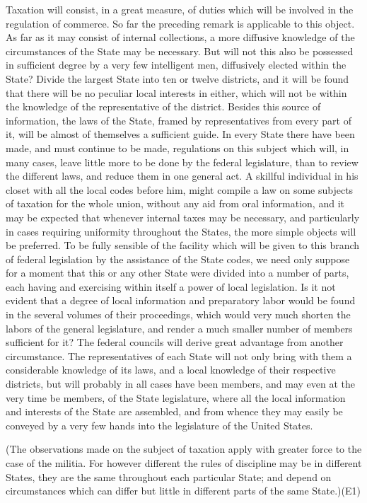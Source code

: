 Taxation will consist, in a great measure, of duties which will be involved in the regulation of commerce. 
So far the preceding remark is applicable to this object. 
As far as it may consist of internal collections, a more diffusive knowledge of the circumstances of the State may be necessary. 
But will not this also be possessed in sufficient degree by a very few intelligent men, diffusively elected within the State? 
Divide the largest State into ten or twelve districts, and it will be found that there will be no peculiar local interests in either, which will not be within the knowledge of the representative of the district. 
Besides this source of information, the laws of the State, framed by representatives from every part of it, will be almost of themselves a sufficient guide. 
In every State there have been made, and must continue to be made, regulations on this subject which will, in many cases, leave little more to be done by the federal legislature, than to review the different laws, and reduce them in one general act. 
A skillful individual in his closet with all the local codes before him, might compile a law on some subjects of taxation for the whole union, without any aid from oral information, and it may be expected that whenever internal taxes may be necessary, and particularly in cases requiring uniformity throughout the States, the more simple objects will be preferred. 
To be fully sensible of the facility which will be given to this branch of federal legislation by the assistance of the State codes, we need only suppose for a moment that this or any other State were divided into a number of parts, each having and exercising within itself a power of local legislation. 
Is it not evident that a degree of local information and preparatory labor would be found in the several volumes of their proceedings, which would very much shorten the labors of the general legislature, and render a much smaller number of members sufficient for it? 
The federal councils will derive great advantage from another circumstance. 
The representatives of each State will not only bring with them a considerable knowledge of its laws, and a local knowledge of their respective districts, but will probably in all cases have been members, and may even at the very time be members, of the State legislature, where all the local information and interests of the State are assembled, and from whence they may easily be conveyed by a very few hands into the legislature of the United States.

(The observations made on the subject of taxation apply with greater force to the case of the militia. 
For however different the rules of discipline may be in different States, they are the same throughout each particular State; and depend on circumstances which can differ but little in different parts of the same State.)(E1)

